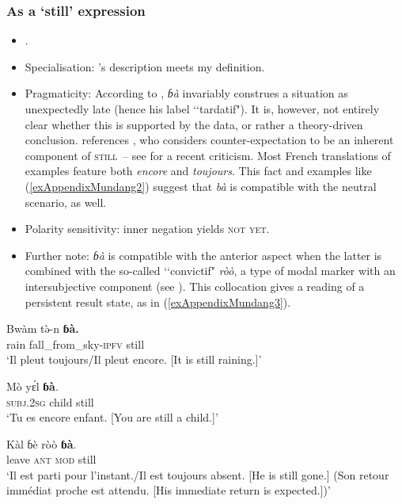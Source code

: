 \subsubsection{As a \lq{}still\rq{ }expression}
\begin{itemize}
	\item \textcite[332, 379–381, 457]{Elders2000}.
	\item Specialisation: \citeauthor{Elders2000}'s description meets my definition.
	\item Pragmaticity: According to \textcite[379]{Elders2000}, \textit{ɓà} invariably construes a situation as unexpectedly late (hence his label \lq\lq tardatif"). It is, however, not entirely clear whether this is supported by the data, or rather a theory-driven conclusion. \citeauthor{Elders2000} references \textcite{Schadeberg1990}, who considers counter-expectation to be an inherent component of \textsc{still}~-- see \cite{vanderAuwera2021} for a recent criticism. Most French translations of examples feature both \textit{encore} and \textit{toujours}. This fact and examples like (\ref{exAppendixMundang2}) suggest that \textit{bà} is compatible with the neutral scenario, as well.
	\item Polarity sensitivity: inner negation yields \textsc{not yet}.
	\item Further note: \textit{ɓà} is compatible with the anterior aspect when the latter is combined with the so-called \lq\lq convictif" \textit{ròò}, a type of modal marker with an intersubjective component (see \cite[434–436]{Elders2000}). This collocation gives a reading of a persistent result state, as in (\ref{exAppendixMundang3}).
\end{itemize}	
\begin{exe}
	\ex \label{exAppendixMundang1}
	\gll Bwàm tə̀-n \textbf{ɓà.}\\
	rain fall\_from\_sky-\textsc{ipfv} still\\
	\glt \lq Il pleut toujours/Il pleut encore. [It is still raining.]\rq{ }\parencite[380]{Elders2000}

	\ex \label{exAppendixMundang2}
	\gll Mò yɛ́l \textbf{ɓà}.\\
	\textsc{subj}.2\textsc{sg} child still\\
	\glt \lq Tu es encore enfant. [You are still a child.]' \parencite[380]{Elders2000}

	\ex \label{exAppendixMundang3}
	\gll Kàl ɓè ròò \textbf{ɓà}.\\
	leave \textsc{ant} \textsc{mod} still\\
	\glt \lq Il est parti pour l’instant./Il est toujours absent.  [He is still gone.] (Son retour immédiat proche est attendu. [His immediate return is expected.])' \parencite[380]{Elders2000}
\end{exe}

